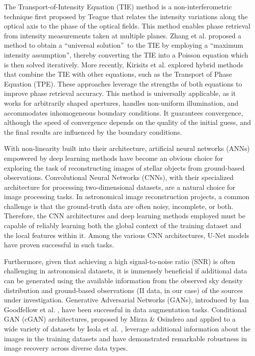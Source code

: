 The Transport-of-Intensity Equation (TIE) method is a non-interferometric technique first proposed by Teague \citep{Teague1983} that relates the intensity variations along the optical axis to the phase of the optical fields. This method enables phase retrieval from intensity measurements taken at multiple planes. Zhang et al. \citep{Zhang2020} proposed a method to obtain a \textquotedblleft universal solution\textquotedblright\ to the TIE by employing a \textquotedblleft maximum intensity assumption\textquotedblright, thereby converting the TIE into a Poisson equation which is then solved iteratively. More recently, Kirisits et al. \citep{Kirisits2024} explored hybrid methods that combine the TIE with other equations, such as the Transport of Phase Equation (TPE). These approaches leverage the strengths of both equations to improve phase retrieval accuracy. This method is universally applicable, as it works for arbitrarily shaped apertures, handles non-uniform illumination, and accommodates inhomogeneous boundary conditions. It guarantees convergence, although the speed of convergence depends on the quality of the initial guess, and the final results are influenced by the boundary conditions.

With non-linearity built into their architecture, artificial neural networks (ANNs) empowered by deep learning methods have become an obvious choice for exploring the task of reconstructing images of stellar objects from ground-based observations. Convolutional Neural Networks (CNNs), with their specialized architecture for processing two-dimensional datasets, are a natural choice for image processing tasks. In astronomical image reconstruction projects, a common challenge is that the ground-truth data are often noisy, incomplete, or both. Therefore, the CNN architectures and deep learning methods employed must be capable of reliably learning both the global context of the training dataset and the local features within it. Among the various CNN architectures, U-Net models \citep{ronneberger2015u} have proven successful in such tasks.

Furthermore, given that achieving a high signal-to-noise ratio (SNR) is often challenging in astronomical datasets, it is immensely beneficial if additional data can be generated using the available information from the observed sky density distribution and ground-based observations (II data, in our case) of the sources under investigation. Generative Adversarial Networks (GANs), introduced by Ian Goodfellow et al. \citep{goodfellow2014generative}, have been successful in data augmentation tasks. Conditional GAN (cGAN) architectures, proposed by Mirza \& Osindero \citep{mirza2014conditional} and applied to a wide variety of datasets by Isola et al. \citep{isola2017image}, leverage additional information about the images in the training datasets and have demonstrated remarkable robustness in image recovery across diverse data types.

